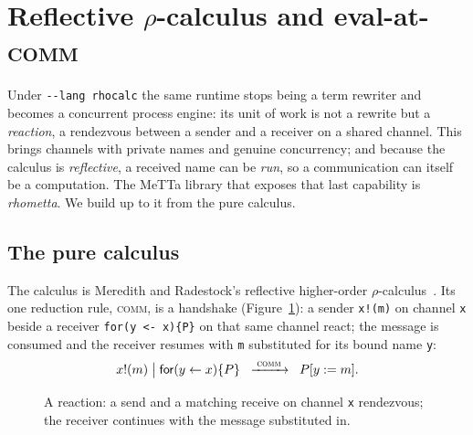 \documentclass[11pt]{article}
\newcommand{\code}[1]{\texttt{#1}}
\begin{document}
\section{Reflective $\rho$-calculus and eval-at-\textsc{comm}}
\label{sec:rhocalc}

Under \code{-{}-lang rhocalc} the same runtime stops being a term rewriter and becomes a
concurrent process engine: its unit of work is not a rewrite but a \emph{reaction}, a
rendezvous between a sender and a receiver on a shared channel. This brings channels with
private names and genuine concurrency; and because the calculus is \emph{reflective}, a
received name can be \emph{run}, so a communication can itself be a computation. The MeTTa
library that exposes that last capability is \emph{rhometta}. We build up to it from the
pure calculus.

\subsection{The pure calculus}

The calculus is Meredith and Radestock's reflective higher-order
$\rho$-calculus~\cite{rho2005}. Its one reduction rule, \textsc{comm}, is a handshake
(Figure~\ref{fig:rho-comm}): a sender \code{x!(m)} on channel \code{x} beside a receiver
\code{for(y <- x)\{P\}} on that
same channel react; the message is consumed and the receiver resumes with \code{m}
substituted for its bound name \code{y}:
\[
  x!(m) \;\big|\; \mathsf{for}(y \leftarrow x)\{P\}
  \;\;\xrightarrow{\;\textsc{comm}\;}\;\; P[y := m].
\]

\begin{figure}[h]\centering
{}
\caption{A reaction: a send and a matching receive on channel \code{x} rendezvous; the
  receiver continues with the message substituted in.}
\label{fig:rho-comm}
\end{figure}
\end{document}
